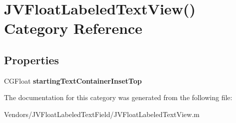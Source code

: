 \hypertarget{category_j_v_float_labeled_text_view_07_08}{}\section{J\+V\+Float\+Labeled\+Text\+View() Category Reference}
\label{category_j_v_float_labeled_text_view_07_08}
\subsection*{Properties}
\begin{DoxyCompactItemize}
\item 
\hypertarget{category_j_v_float_labeled_text_view_07_08_a23fa83aa07f20feb4e5007ab6e12ec1b}{}C\+G\+Float {\bfseries starting\+Text\+Container\+Inset\+Top}\label{category_j_v_float_labeled_text_view_07_08_a23fa83aa07f20feb4e5007ab6e12ec1b}

\end{DoxyCompactItemize}


The documentation for this category was generated from the following file\+:\begin{DoxyCompactItemize}
\item 
Vendors/\+J\+V\+Float\+Labeled\+Text\+Field/J\+V\+Float\+Labeled\+Text\+View.\+m\end{DoxyCompactItemize}
